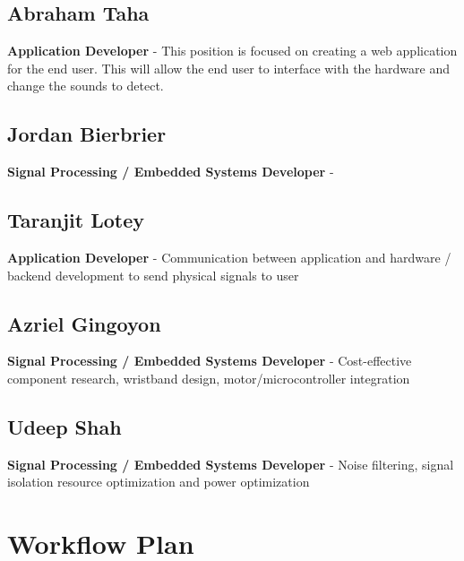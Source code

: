 \documentclass{article}
\begin{document}
\subsection*{Abraham Taha}
\textbf{Application Developer} - This position is focused on creating a web application for the
end user. This will allow the end user to interface with the hardware and change the sounds to
detect.

\subsection*{Jordan Bierbrier}
\textbf{Signal Processing / Embedded Systems Developer} - 

\subsection*{Taranjit Lotey}
\textbf{Application Developer} - Communication between application and hardware / backend development to send physical signals to user                                     

\subsection*{Azriel Gingoyon}
\textbf{Signal Processing / Embedded Systems Developer} - Cost-effective component research, wristband design, motor/microcontroller integration                                                                                                                               

\subsection*{Udeep Shah}
\textbf{Signal Processing / Embedded Systems Developer} - Noise filtering, signal isolation resource optimization and power optimization 


\section{Workflow Plan}
\end{document}
